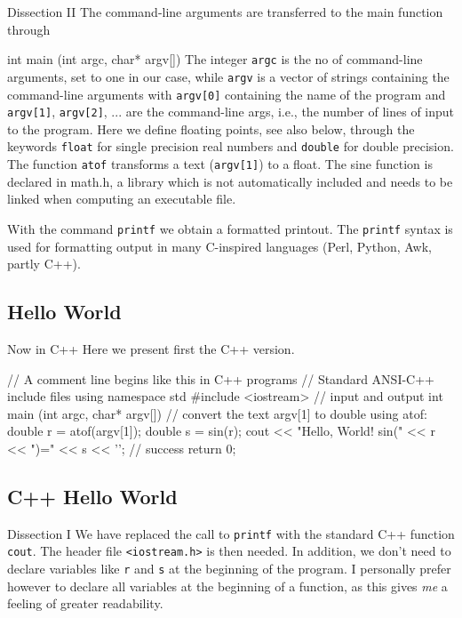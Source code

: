 \documentclass[%
oneside,                 %
final,                   %
10pt]{article}
\begin{document}
\begin{block}{Dissection II }
The command-line arguments are transferred to the main function through

\bcppcod
   int main (int argc, char* argv[])
\ecppcod
The integer \Verb!argc! is the no of command-line arguments, set to
one in our case, while
\Verb!argv! is a vector of strings containing the command-line arguments
with \Verb!argv[0]! containing  the name of the program
and \Verb!argv[1]!, \Verb!argv[2]!, ... are the command-line args, i.e., the number of
lines of input to the program.
Here we define floating points, see also below,
through the keywords \Verb!float! for single precision real numbers and
\Verb!double! for double precision. The function
\Verb!atof! transforms a text (\Verb!argv[1]!) to a float.
The sine function is declared in math.h, a library which
is not automatically included and needs to be linked when computing
an executable file.

With the command \Verb!printf! we obtain a formatted printout.
The \Verb!printf! syntax is used for formatting output
in many C-inspired languages (Perl, Python, Awk, partly C++).
\end{block}

\subsection{Hello World}

\begin{block}{Now in C++ }
Here we present first the C++ version.

\bcpppro
// A comment line begins like this in C++ programs
// Standard ANSI-C++ include files
using namespace std
#include <iostream>  // input and output
int main (int argc, char* argv[])
{
  // convert the text argv[1] to double using atof:
  double r = atof(argv[1]);
  double s = sin(r);
  cout << "Hello, World! sin(" << r << ")=" << s << '\n';
  // success
  return 0;
}
\ecpppro
\end{block}

\subsection{C++ Hello World}

\begin{block}{Dissection I }
We have replaced the call to \Verb!printf! with the standard C++ function
\Verb!cout!. The header file \Verb!<iostream.h>! is then needed.
In addition, we don't need to
declare variables like \Verb!r! and \Verb!s!  at the beginning of the program.
I personally prefer
however to declare all variables at the beginning of a function, as this
gives \emph{me} a feeling of greater readability.
\end{block}
\end{document}
